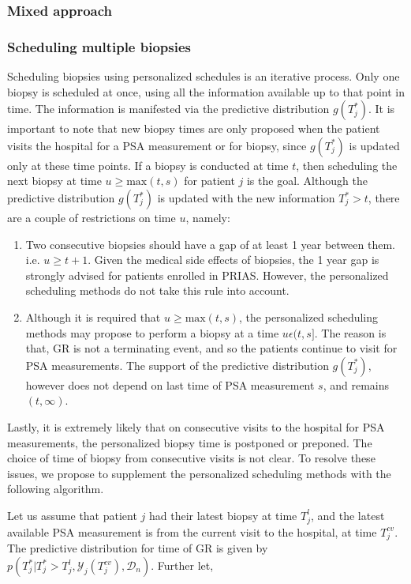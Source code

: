 \subsubsection{Mixed approach}

\subsubsection{Scheduling multiple biopsies}
Scheduling biopsies using personalized schedules is an iterative process. Only one biopsy is scheduled at once, using all the information available up to that point in time. The information is manifested via the predictive distribution $g(T^*_j)$. It is important to note that new biopsy times are only proposed when the patient visits the hospital for a PSA measurement or for biopsy, since $g(T^*_j)$ is updated only at these time points. If a biopsy is conducted at time $t$, then scheduling the next biopsy at time $u \geq \text{max}(t,s)$ for patient $j$ is the goal. Although the predictive distribution $g(T^*_j)$ is updated with the new information $T^*_j > t$, there are a couple of restrictions on time $u$, namely:

\begin{enumerate}
\item Two consecutive biopsies should have a gap of at least 1 year between them. i.e. $u \geq t + 1$. Given the medical side effects of biopsies, the 1 year gap is strongly advised for patients enrolled in PRIAS. However, the personalized scheduling methods do not take this rule into account.
\item Although it is required that $u \geq \text{max}(t,s)$, the personalized scheduling methods may propose to perform a biopsy at a time $u \epsilon (t, s]$. The reason is that, GR is not a terminating event, and so the patients continue to visit for PSA measurements. The support of the predictive distribution $g(T^*_j)$, however does not depend on last time of PSA measurement $s$, and remains $(t, \infty)$.
\end{enumerate}
 
Lastly, it is extremely likely that on consecutive visits to the hospital for PSA measurements, the personalized biopsy time is postponed or preponed. The choice of time of biopsy from consecutive visits is not clear. To resolve these issues, we propose to supplement the personalized scheduling methods with the following algorithm.

Let us assume that patient $j$ had their latest biopsy at time $T^l_j$, and the latest available PSA measurement is from the current visit to the hospital, at time $T^{cv}_j$. The predictive distribution for time of GR is given by $p(T^*_j|T^*_j > T^l_j, \mathcal{Y}_j(T^{cv}_j), \mathcal{D}_n)$. Further let,

